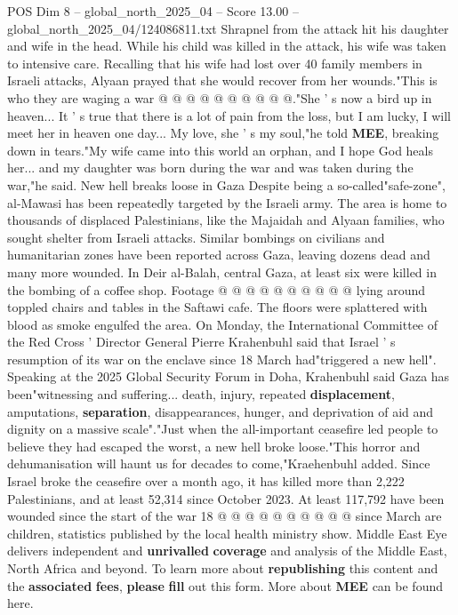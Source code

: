 \begin{textsample}{POS Dim 8 – global\_north\_2025\_04 – Score 13.00 – global\_north\_2025\_04/124086811.txt}
Shrapnel from the attack hit his daughter and wife in the head.
While his child was killed in the attack, his wife was taken to intensive care.
Recalling that his wife had lost over 40 family members in Israeli attacks, Alyaan prayed that she would recover from her wounds."This is who they are waging a war @ @ @ @ @ @ @ @ @ @."She ' s now a bird up in heaven...
It ' s true that there is a lot of pain from the loss, but I am lucky, I will meet her in heaven one day...
My love, she ' s my soul,"he told \textbf{MEE}, breaking down in tears."My wife came into this world an orphan, and I hope God heals her... and my daughter was born during the war and was taken during the war,"he said.
New hell breaks loose in Gaza Despite being a so-called"safe-zone", al-Mawasi has been repeatedly targeted by the Israeli army.
The area is home to thousands of displaced Palestinians, like the Majaidah and Alyaan families, who sought shelter from Israeli attacks.
Similar bombings on civilians and humanitarian zones have been reported across Gaza, leaving dozens dead and many more wounded.
In Deir al-Balah, central Gaza, at least six were killed in the bombing of a coffee shop.
Footage @ @ @ @ @ @ @ @ @ @ lying around toppled chairs and tables in the Saftawi cafe.
The floors were splattered with blood as smoke engulfed the area.
On Monday, the International Committee of the Red Cross ' Director General Pierre Krahenbuhl said that Israel ' s resumption of its war on the enclave since 18 March had"triggered a new hell".
Speaking at the 2025 Global Security Forum in Doha, Krahenbuhl said Gaza has been"witnessing and suffering... death, injury, repeated \textbf{displacement}, amputations, \textbf{separation}, disappearances, hunger, and deprivation of aid and dignity on a massive scale"."Just when the all-important ceasefire led people to believe they had escaped the worst, a new hell broke loose."This horror and dehumanisation will haunt us for decades to come,"Kraehenbuhl added.
Since Israel broke the ceasefire over a month ago, it has killed more than 2,222 Palestinians, and at least 52,314 since October 2023.
At least 117,792 have been wounded since the start of the war 18 @ @ @ @ @ @ @ @ @ @ since March are children, statistics published by the local health ministry show.
Middle East Eye delivers independent and \textbf{unrivalled} \textbf{coverage} and analysis of the Middle East, North Africa and beyond.
To learn more about \textbf{republishing} this content and the \textbf{associated} \textbf{fees}, \textbf{please} \textbf{fill} out this form.
More about \textbf{MEE} can be found here.

\end{textsample}

